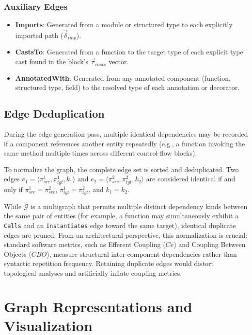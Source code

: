 \subsubsection{Auxiliary Edges}
\begin{itemize}
  \item \textbf{Imports}: Generated from a module or structured type
    to each explicitly imported path ($\vec{\delta}_{imp}$).
  \item \textbf{CastsTo}: Generated from a function to the target
    type of each explicit type cast found in the block's
    $\vec{\tau}_{casts}$ vector.
  \item \textbf{AnnotatedWith}: Generated from any annotated
    component (function, structured type, field) to the resolved type
    of each annotation or decorator.
\end{itemize}

\subsection{Edge Deduplication}
During the edge generation pass, multiple identical dependencies may be
re\-cord\-ed if a component references another entity repeatedly (e.g., a
  function invoking the same method multiple times across different
control-flow blocks).

To normalize the graph, the complete edge set is sorted and deduplicated.
Two edges $e_1 = \langle \pi_{src}^1, \pi_{tgt}^1, k_1 \rangle$ and
$e_2 = \langle \pi_{src}^2, \pi_{tgt}^2, k_2 \rangle$ are considered
identical if and only if $\pi_{src}^1 = \pi_{src}^2$,
$\pi_{tgt}^1 = \pi_{tgt}^2$, and $k_1 = k_2$.

While $\mathcal{G}$ is a multigraph that permits multiple distinct
dependency kinds between the same pair of entities (for example, a
  function may simultaneously exhibit a \texttt{Calls} and an
\texttt{Instantiates} edge toward the same target), identical duplicate
edges are pruned. From an architectural perspective, this normalization
is crucial: standard software metrics, such as Efferent Coupling ($Ce$)
and Coupling Between Objects ($CBO$), measure structural inter-component
dependencies rather than syntactic repetition frequency. Retaining
duplicate edges would distort topological analyses and artificially
inflate coupling metrics.

\section{Graph Representations and Visualization}
\label{sec:cytoscape_export}

